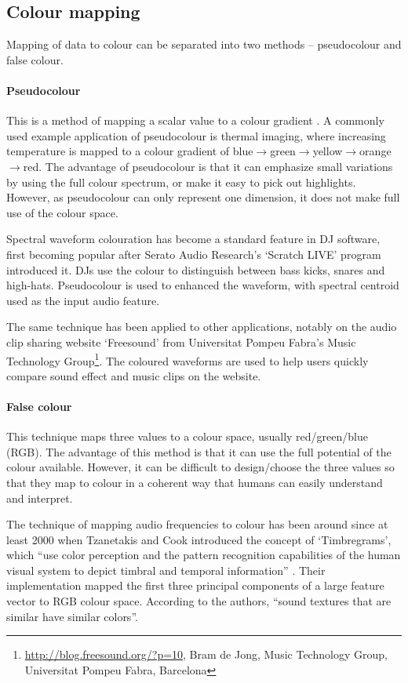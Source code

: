 \subsection{Colour mapping}\label{sec:litreviewcolour}
Mapping of data to colour can be separated into two methods -- pseudocolour and
false colour.

\paragraph{Pseudocolour}
This is a method of mapping a scalar value to a colour gradient
\citep{Moreland2009}. A commonly used example application of pseudocolour is
thermal imaging, where increasing temperature is mapped to a colour gradient of
blue$\to$green$\to$yellow$\to$orange$\to$red. The advantage of pseudocolour is
that it can emphasize small variations by using the full colour spectrum, or
make it easy to pick out highlights. However, as pseudocolour can only
represent one dimension, it does not make full use of the colour space.

Spectral waveform colouration has become a standard feature in DJ software,
first becoming popular after Serato Audio Research's `Scratch LIVE' program
introduced it.  DJs use the colour to distinguish between bass kicks, snares
and high-hats. Pseudocolour is used to enhanced the waveform, with spectral
centroid used as the input audio feature.

The same technique has been applied to other applications, notably on the audio
clip sharing website `Freesound' from Universitat Pompeu Fabra's Music
Technology Group\footnote{\url{http://blog.freesound.org/?p=10}, Bram de Jong,
  Music Technology Group, Universitat Pompeu Fabra, Barcelona}. The coloured
waveforms are used to help users quickly compare sound effect and music clips
on the website.

\paragraph{False colour}
This technique maps three values to a colour space, usually red/green/blue
(RGB). The advantage of this method is that it can use the full potential of
the colour available. However, it can be difficult to design/choose the three
values so that they map to colour in a coherent way that humans can easily
understand and interpret.

The technique of mapping audio frequencies to colour has been around since at
least 2000 when Tzanetakis and Cook introduced the concept of `Timbregrams',
which ``use color perception and the pattern recognition capabilities of the
human visual system to depict timbral and temporal information''
\citep{Tzanetakis2000}. Their implementation mapped the first three principal
components of a large feature vector to RGB colour space. According to the
authors, ``sound textures that are similar have similar colors''.

